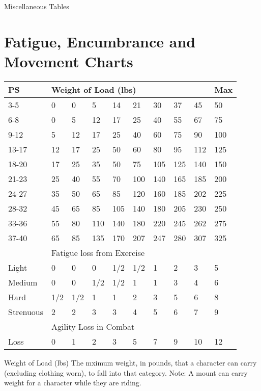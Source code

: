 \begin{Tables}{Miscellaneous Tables}

\section{Fatigue, Encumbrance and Movement Charts}

\begin{tabularx}{\linewidth}{Xlllllllll}
PS		& \multicolumn{8}{l}{Weight of Load (lbs)} & Max \\ \hline
3-5		& 0	& 0	& 5	& 14	& 21	& 30	& 37	& 45	& 50 \\
6-8		& 0	& 5	& 12	& 17	& 25	& 40	& 55	& 67	& 75 \\
9-12		& 5	& 12	& 17	& 25	& 40	& 60	& 75	& 90	& 100 \\
13-17		& 12	& 17	& 25	& 50	& 60	& 80	& 95	& 112	& 125 \\
18-20		& 17	& 25	& 35	& 50	& 75	& 105	& 125	& 140	& 150 \\
21-23		& 25	& 40	& 55	& 70	& 100	& 140	& 165	& 185	& 200 \\
24-27		& 35	& 50	& 65	& 85	& 120	& 160	& 185	& 202	& 225 \\
28-32		& 45	& 65	& 85	& 105	& 140	& 180	& 205	& 230	& 250 \\
33-36		& 55	& 80	& 110	& 140	& 180	& 220	& 245	& 262	& 275 \\
37-40		& 65	& 85	& 135	& 170	& 207	& 247	& 280	& 307	& 325 \\ \hline
 & \multicolumn{8}{l}{Fatigue loss from Exercise} \\ \hline
Light 		& 0	& 0	& 0	& 1/2	& 1/2	& 1	& 2	& 3	& 5 \\
Medium 		& 0	& 0	& 1/2	& 1/2	& 1	& 1	& 3	& 4	& 6 \\
Hard 		& 1/2	& 1/2	& 1	& 1	& 2	& 3	& 5	& 6	& 8 \\
Strenuous 	& 2	& 2	& 3	& 3	& 4	& 5	& 6	& 7	& 9 \\ \hline
 & \multicolumn{8}{l}{Agility Loss in Combat} \\ \hline
Loss 		& 0	& 1	& 2	& 3	& 5	& 7	& 9	& 10	& 12 \\
\end{tabularx}

\begin{Description}
\item[Weight of Load (lbs)] The mximum weight, in pounds, that a
  character can carry (excluding clothing worn), to fall into that
  category. Note: A mount can carry weight for a character while they
  are riding.


\end{Description}
\end{Tables}
